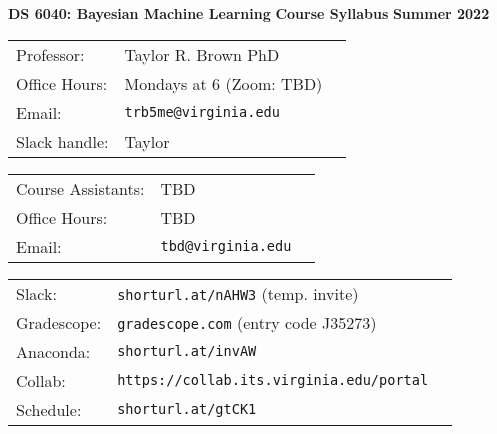 \documentclass[11pt]{article}
\begin{document}
\noindent
    {\large \bf DS 6040: Bayesian Machine Learning} \hfill
    {\large \bf Course Syllabus} \hfill
    {\large \bf Summer 2022}

\bigskip

\begin{tabular}{lll}
   Professor: &  Taylor R. Brown PhD \\
   Office Hours: & Mondays at 6 (Zoom: TBD) \\
     Email: & \verb+trb5me@virginia.edu+ \\
     Slack handle: & Taylor 
\end{tabular}

\vspace*{.1in}

\begin{tabular}{lll}
   Course Assistants: &  TBD  \\
   Office Hours: & TBD\\
     Email: & \verb+tbd@virginia.edu+\\
\end{tabular}

\vspace*{.1in}


\begin{tabular}{lll}
   Slack: & \verb+shorturl.at/nAHW3+ (temp. invite) \\
   Gradescope: &\verb|gradescope.com| (entry code J35273)\\
   Anaconda: &\verb|shorturl.at/invAW| \\
   Collab: &\verb|https://collab.its.virginia.edu/portal| \\
   Schedule: & \verb|shorturl.at/gtCK1|
\end{tabular}
\end{document}
